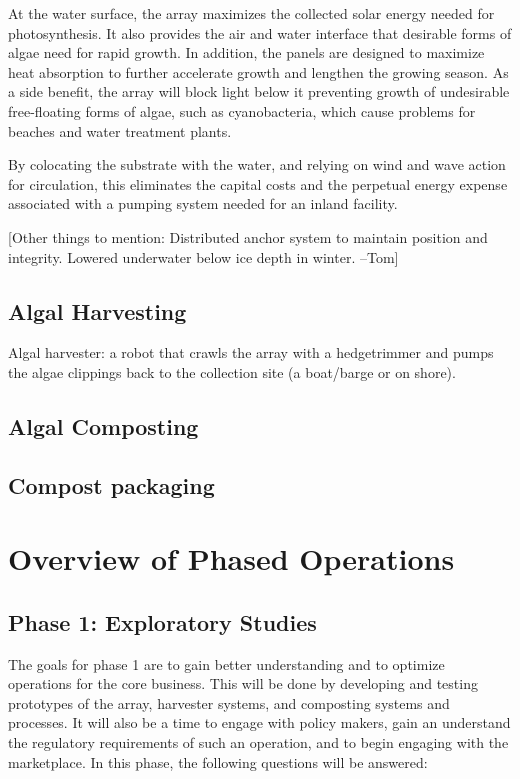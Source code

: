 \documentclass{article}
\newcommand{\tom}[1]{{\color{blue}[#1 --Tom]}}
\begin{document}
At the water surface, the array maximizes the collected solar energy
needed for photosynthesis.
It also provides the air and water interface that desirable forms of algae need for rapid growth.
In addition, the panels are designed to maximize heat absorption
to further accelerate growth and lengthen the growing season.
As a side benefit, the array will block light below it
preventing growth of undesirable free-floating forms of algae,
such as cyanobacteria, which cause problems for beaches and water treatment plants.

By colocating the substrate with the water, and relying on
wind and wave action for circulation, this eliminates the capital
costs and the perpetual energy expense associated with a pumping system
needed for an inland facility.


\tom{Other things to mention:
Distributed anchor system to maintain position and integrity.
Lowered underwater below ice depth in winter.
}

\subsection{Algal Harvesting}

Algal harvester: a robot that crawls the array
with a hedgetrimmer and pumps the algae clippings
back to the collection site (a boat/barge or on shore).

\subsection{Algal Composting}
\subsection{Compost packaging}

\section{Overview of Phased Operations}
\subsection{Phase 1: Exploratory Studies}

The goals for phase 1 are to gain better understanding and to optimize
operations for the core business.  This will be done by
developing and testing prototypes of the array,
harvester systems, and composting systems and processes.
It will also be a time to engage with policy makers,
gain an understand the regulatory requirements of such an operation,
and to begin engaging with the marketplace.
In this phase, the following questions will be answered:
\end{document}
